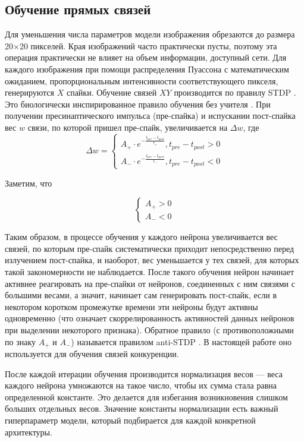 \documentclass[a4paper]{article}
\begin{document}
\subsection{Обучение прямых связей}
Для уменьшения числа параметров модели изображения обрезаются до размера 20$\times$20 пикселей. Края изображений часто практически пусты, поэтому эта операция практически не влияет на объем информации, доступный сети. Для каждого изображения при помощи распределения Пуассона с математическим ожиданием, пропорциональным интенсивности соответствующего пикселя, генерируются $X$ спайки. Обучение связей $XY$ производится по правилу STDP \cite{STDP}. Это биологически инспирированное правило обучения без учителя \cite{STDP}. При получении пресинаптического импульса (пре-спайка) и испускании пост-спайка вес $w$ связи, по которой пришел пре-спайк, увеличивается на $\Delta w$, где
\begin{equation} 
\Delta w =
 \begin{cases}
 A_+ \cdot e^{- \frac{t_{pre} - t_{post}}{\tau_+}}, t_{pre} - t_{post} > 0\\
 A_- \cdot e^{- \frac{t_{pre} - t_{post}}{\tau_-}}, t_{pre} - t_{post} < 0
 \end{cases}
\end{equation}

Заметим, что

$$
\begin{cases}
 A_{+} > 0\\
 A_{-} < 0
\end{cases}
$$

Таким образом, в процессе обучения у каждого нейрона увеличивается вес связей, по которым пре-спайк систематически приходит непосредственно перед излучением пост-спайка, и наоборот, вес уменьшается у тех связей, для которых такой закономерности не наблюдается. После такого обучения нейрон начинает активнее реагировать на пре-спайки от нейронов, соединенных с ним связями с большими весами, а значит, начинает сам генерировать пост-спайк, если в некотором коротком промежутке времени эти нейроны будут активны одновременно (что означает скоррелированность активностей данных нейронов при выделении некоторого признака). Обратное правило (с противоположными по знаку $A_{+}$ и $A_{-}$) называется правилом anti-STDP \cite{anti-STDP}. В настоящей работе оно используется для обучения связей конкуренции.

После каждой итерации обучения производится нормализация весов --- веса каждого нейрона умножаются на такое число, чтобы их сумма стала равна определенной константе. Это делается для избегания возникновения слишком больших отдельных весов. Значение константы нормализации есть важный гиперпараметр модели, который подбирается для каждой конкретной архитектуры.
\end{document}
